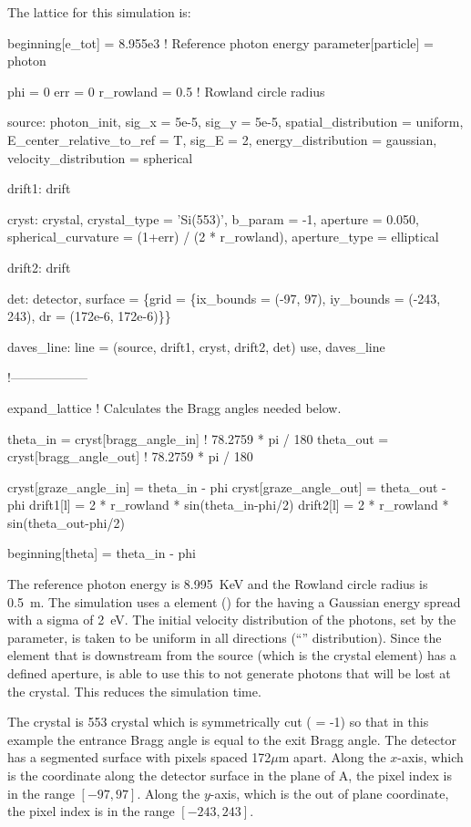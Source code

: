 The lattice for this simulation is:
\begin{example}
  beginning[e_tot] = 8.955e3    ! Reference photon energy
  parameter[particle] = photon

  phi = 0
  err = 0
  r_rowland = 0.5               ! Rowland circle radius

  source: photon_init, sig_x = 5e-5, sig_y = 5e-5, spatial_distribution = uniform,
          E_center_relative_to_ref = T, sig_E = 2, energy_distribution = gaussian,
          velocity_distribution = spherical

  drift1: drift

  cryst: crystal, crystal_type = 'Si(553)', b_param = -1, aperture = 0.050,
  	spherical_curvature = (1+err) / (2 * r_rowland), aperture_type = elliptical

  drift2: drift

  det: detector, surface = \{grid = \{ix_bounds = (-97, 97), 
                                    iy_bounds = (-243, 243), dr = (172e-6, 172e-6)\}\}

  daves_line: line = (source, drift1, cryst, drift2, det)
  use, daves_line

  !------------------

  expand_lattice ! Calculates the Bragg angles needed below.

  theta_in  = cryst[bragg_angle_in]  ! 78.2759 * pi / 180
  theta_out = cryst[bragg_angle_out] ! 78.2759 * pi / 180

  cryst[graze_angle_in]  = theta_in - phi
  cryst[graze_angle_out] = theta_out - phi
  drift1[l] = 2 * r_rowland * sin(theta_in-phi/2)
  drift2[l] = 2 * r_rowland * sin(theta_out-phi/2)

  beginning[theta] = theta_in - phi
\end{example}

The reference photon energy is 8.995~KeV and the Rowland circle radius is 0.5~m. The simulation uses
a  element () for the  having a Gaussian energy
spread with a sigma of 2~eV.  The initial velocity distribution of the photons, set by the
 parameter, is taken to be uniform in all directions (``''
distribution). Since the element that is downstream from the source (which is the crystal element)
has a defined aperture, \bmad is able to use this to not generate photons that will be lost at the
crystal. This reduces the simulation time.

The crystal is  553 crystal which is symmetrically cut ( = -1) so that in
this example the entrance Bragg angle is equal to the exit Bragg angle.  The detector has a
segmented surface with pixels spaced 172$\mu$m apart. Along the $x$-axis, which is the coordinate
along the detector surface in the plane of A, the pixel index is in the range $[-97,
97]$. Along the $y$-axis, which is the out of plane coordinate, the pixel index is in the range
$[-243,243]$.

